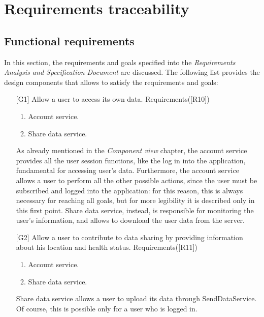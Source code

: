 \section{Requirements traceability}
\subsection{Functional requirements}
In this section, the requirements and goals specified into the \textit{Requirements Analysis and Specification Document} are discussed. 
The following list provides the design components that allows to satisfy the requirements and goals: 
\begin{itemize}
\item[{[G1]}] Allow a user to access its own data. Requirements([R10])
	\begin{enumerate}
	\item Account service.
	\item Share data service.
	\end{enumerate}
As already mentioned in the \textit{Component view} chapter, the account service provides all the user session functions, like the log in into
the application, fundamental for accessing user's data. 
Furthermore, the account service allows a user to perform all the other possible actions, since the user must be subscribed and logged into
the application: for this reason, this is always necessary for reaching all goals, but for more legibility it is described only in this first
point. 
Share data service, instead, is responsible for monitoring the user's information, and allows to download the user data from the server.

\item[{[G2]}] Allow a user to contribute to data sharing by providing information about his location and health status. Requirements([R11])
	\begin{enumerate}
	\item Account service.
	\item Share data service.
	\end{enumerate}
Share data service allows a user to upload its data through SendDataService. 
Of course, this is possible only for a user who is logged in. 


\end{itemize}
